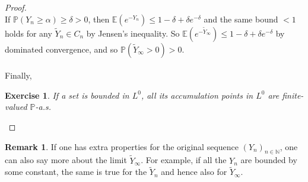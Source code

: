 \documentclass[12pt,a4paper, twoside]{article}
\newtheorem{exe}{Exercise}[section]
\theoremstyle{definition}
\newtheorem{rem}{Remark}[section]
\newcommand{\EE}{\mathbb{E}} %
\newcommand{\PP}{\mathbb{P}} %
\begin{document}
\begin{proof}
\\
If $\PP(Y_n \geq \alpha) \geq \delta >0$, then $\EE(e^{-Y_n}) \leq 1- \delta + \delta e^{- \delta}$ and the same bound $<1$ holds for any $\widetilde{Y}_n \in C_n$ by Jensen's inequality. So $\EE(e^{- \widetilde{Y}_\infty}) \leq 1- \delta + \delta e^{- \delta}$ by dominated convergence, and so $\PP(\widetilde{Y}_\infty >0)>0$. 
\\\\
Finally,
\begin{exe} If a set is bounded in $L^0$, all its accumulation points in $L^0$ are finite-valued $\PP$-a.s.
\end{exe}
\end{proof}
\begin{rem} If one has extra properties for the original sequence $(Y_n)_{n \in \mathbb{N}}$, one can also say more about the limit $\widetilde{Y}_\infty$. For example, if all the $Y_n$ are bounded by some constant,  the same is true for the $\widetilde{Y}_n$ and hence also for $\widetilde{Y}_\infty$. 
\end{rem}
\newpage
\end{document}
